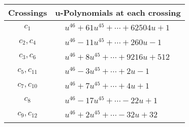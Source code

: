 \documentclass[1p]{elsarticle_modified}
\theoremstyle{definition}
\begin{document}
\begin{tabular}{m{50pt}|m{274pt}}
Crossings & \hspace{64pt}u-Polynomials at each crossing \\
\hline $$\begin{aligned}c_{1}\end{aligned}$$&$\begin{aligned}
&u^{46}+61 u^{45}+\cdots+62504 u+1
\end{aligned}$\\
\hline $$\begin{aligned}c_{2},c_{4}\end{aligned}$$&$\begin{aligned}
&u^{46}-11 u^{45}+\cdots+260 u-1
\end{aligned}$\\
\hline $$\begin{aligned}c_{3},c_{6}\end{aligned}$$&$\begin{aligned}
&u^{46}+8 u^{45}+\cdots+9216 u+512
\end{aligned}$\\
\hline $$\begin{aligned}c_{5},c_{11}\end{aligned}$$&$\begin{aligned}
&u^{46}-3 u^{45}+\cdots+2 u-1
\end{aligned}$\\
\hline $$\begin{aligned}c_{7},c_{10}\end{aligned}$$&$\begin{aligned}
&u^{46}+7 u^{45}+\cdots+4 u+1
\end{aligned}$\\
\hline $$\begin{aligned}c_{8}\end{aligned}$$&$\begin{aligned}
&u^{46}-17 u^{45}+\cdots-22 u+1
\end{aligned}$\\
\hline $$\begin{aligned}c_{9},c_{12}\end{aligned}$$&$\begin{aligned}
&u^{46}+2 u^{45}+\cdots-32 u+32
\end{aligned}$\\
\hline
\end{tabular}\\~\\
\newpage\renewcommand{\arraystretch}{1}
\end{document}
